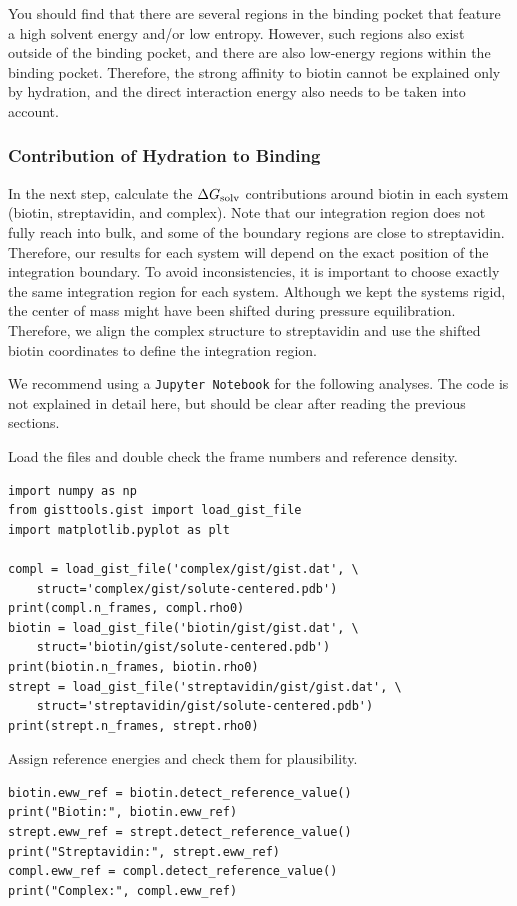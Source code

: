 \documentclass[9pt,tutorial]{livecoms}
\newcommand{\dgsolv}{\Delta G_\textup{solv}}
\newcommand{\software}{\texttt}
\begin{document}
You should find that there are several regions in the binding pocket that feature a high solvent energy and/or low entropy.
However, such regions also exist outside of the binding pocket, and there are also low-energy regions within the binding pocket.
Therefore, the strong affinity to biotin cannot be explained only by hydration, and the direct interaction energy also needs to be taken into account.

\subsubsection{Contribution of Hydration to Binding}
\label{sec:binding_contributions}
In the next step, calculate the $\dgsolv$ contributions around biotin in each system (biotin, streptavidin, and complex).
Note that our integration region does not fully reach into bulk, and some of the boundary regions are close to streptavidin. 
Therefore, our results for each system will depend on the exact position of the integration boundary. 
To avoid inconsistencies, it is important to choose exactly the same integration region for each system.
Although we kept the systems rigid, the center of mass might have been shifted during pressure equilibration.
Therefore, we align the complex structure to streptavidin and use the shifted biotin coordinates to define the integration region.

We recommend using a \software{Jupyter Notebook} for the following analyses.
The code is not explained in detail here, but should be clear after reading the previous sections.

Load the files and double check the frame numbers and reference density.
\begin{lstlisting}[style=python]
import numpy as np
from gisttools.gist import load_gist_file
import matplotlib.pyplot as plt

compl = load_gist_file('complex/gist/gist.dat', \
    struct='complex/gist/solute-centered.pdb')
print(compl.n_frames, compl.rho0)
biotin = load_gist_file('biotin/gist/gist.dat', \
    struct='biotin/gist/solute-centered.pdb')
print(biotin.n_frames, biotin.rho0)
strept = load_gist_file('streptavidin/gist/gist.dat', \
    struct='streptavidin/gist/solute-centered.pdb')
print(strept.n_frames, strept.rho0)
\end{lstlisting}
Assign reference energies and check them for plausibility.
\begin{lstlisting}[style=python]
biotin.eww_ref = biotin.detect_reference_value()
print("Biotin:", biotin.eww_ref)
strept.eww_ref = strept.detect_reference_value()
print("Streptavidin:", strept.eww_ref)
compl.eww_ref = compl.detect_reference_value()
print("Complex:", compl.eww_ref)
\end{lstlisting}
\end{document}

